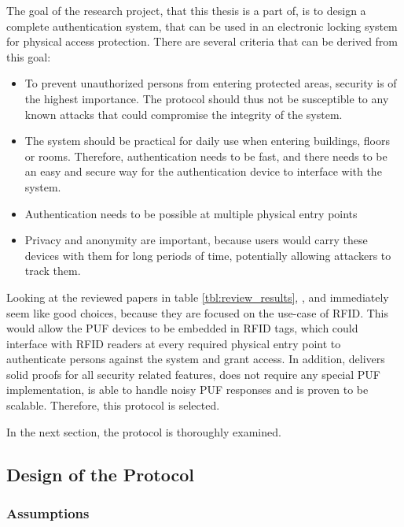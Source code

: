 The goal of the research project, that this thesis is a part of, is to design a complete
authentication system, that can be used in an electronic locking system for physical access protection.
There are several criteria that can be derived from this goal:
\begin{itemize}
    \item To prevent unauthorized persons from entering protected areas, security is of the highest importance.
          The protocol should thus not be susceptible to any known attacks that could compromise the integrity of the system.
    \item The system should be practical for daily use when entering buildings, floors or rooms.
          Therefore, authentication needs to be fast, and there needs to be an easy and secure way for
          the authentication device to interface with the system.
    \item Authentication needs to be possible at multiple physical entry points
    \item Privacy and anonymity are important, because users would carry these devices
          with them for long periods of time, potentially allowing attackers to track them.
\end{itemize}

Looking at the reviewed papers in table \ref{tbl:review_results}, \cite{Gope2018}, \cite{Zhu2019} and \cite{Hristea2019} immediately
seem like good choices, because they are focused on the use-case of RFID.
This would allow the PUF devices to be embedded in RFID tags, which could interface with RFID readers
at every required physical entry point to authenticate persons against the system and grant access.
In addition, \cite{Zhu2019} delivers solid proofs for all security related features,
does not require any special PUF implementation, is able to handle noisy PUF responses
and is proven to be scalable. Therefore, this protocol is selected.

In the next section, the protocol is thoroughly examined.

\subsection{Design of the Protocol}
\label{sec:imp_design}

\subsubsection{Assumptions}

